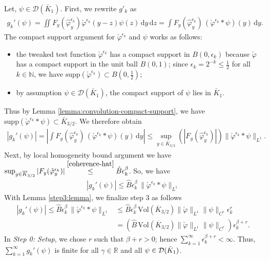 Let, $\psi \in \mathcal{D}(\bar K_1)$. First, we rewrite $g'_k$ as 
\begin{align}\label{gk-formular}
    g_k'(\psi) = \iint F_y(\hat{\varphi}^{\epsilon_k}_{y}) \check \varphi^{\epsilon_k}(y-z) \psi(z) \, \mathrm{d}y \, \mathrm{d}z = \int F_y(\hat \varphi^{\epsilon_k}_y) \, (\check \varphi^{\epsilon_k} * \psi)(y) \, \mathrm{d}y.
\end{align}
The compact support argument for $\check \varphi^{\epsilon_k}$ and $\psi$ works as follows: 
\begin{itemize}
    \item the tweaked test function $\check \varphi^{\epsilon_k}$ has a compact support in $B(0, \epsilon_k)$ because $\check \varphi$ has a compact support in the unit ball $B(0,1)$; since $\epsilon_k = 2^{-k} \leq \frac{1}{2}$ for all $k \in \mathbb{N}$, we have $\mathrm{supp} \left( \check \varphi^{\epsilon_k} \right) \subset B(0,\frac{1}{2})$;
    \item by assumption $\psi \in \mathcal{D}(\bar K_1)$, the compact support of $\psi$ lies in $\bar K_1$.
\end{itemize}
Thus by Lemma \ref{lemma:convolution-compact-support}, we have $\mathrm{supp} \left( \check \varphi^{\epsilon_k} * \psi \right) \subset \bar K_{3/2}.$ We therefore obtain 
\begin{align*}
    |g_k'(\psi)| = \left|\int F_y(\hat \varphi^{\epsilon_k}_y) \, (\check \varphi^{\epsilon_k} * \psi)(y) \, \mathrm{d}y\right| 
    \leq \sup_{y \in \overline K_{3/2}} \left(|F_y(\hat \varphi^{\epsilon_k}_y)| \right) \lVert \check \varphi^{\epsilon_k} * \psi \rVert_{L^1}.
\end{align*}
Next, by {local homogeneity bound} argument we have $
    \sup_{y \in \overline K_{3/2}} |F_y(\hat \varphi^{\epsilon_k}_y)|  \overset{\eqref{coherence-hat}}{\leq}  \hat B \epsilon_k^\beta$. 
So, we have 
\begin{align*}
    |g_k'(\psi)| \leq \hat B \epsilon_k^\beta \, \lVert \check \varphi^{\epsilon_k} * \psi \rVert_{L^1}
\end{align*}
With Lemma \ref{step3:lemma}, we finalize step 3 as follows 
\begin{align}
    |g_k'(\psi)| \leq \hat B \epsilon_k^\beta \, \lVert \check \varphi^{\epsilon_k} * \psi \rVert_{L^1} &\leq \hat B \epsilon_k^\beta \,  \mathrm{Vol}(\overline K_{3/2})  \lVert \check \varphi \rVert_{L^1} \lVert \psi \rVert_{C^r} \epsilon^r_k \nonumber \\
    &= \left( \hat B \, \mathrm{Vol}(\overline K_{3/2})  \lVert \check \varphi \rVert_{L^1} \lVert \psi \rVert_{C^r} \right)\epsilon^{\beta + r}_k. \label{Mustermkatze}
\end{align}
In \emph{Step 0: Setup}, we chose $r$ such that  $\beta + r > 0$; hence $\sum_{k=1}^\infty \epsilon_k^{\beta + r} < \infty$. Thus, $\sum^\infty_{k=1} g_k'(\psi)$ is finite for all $\gamma \in \mathbb{R}$ and all $\psi \in \mathcal{D}(\bar{K}_{1})$.

